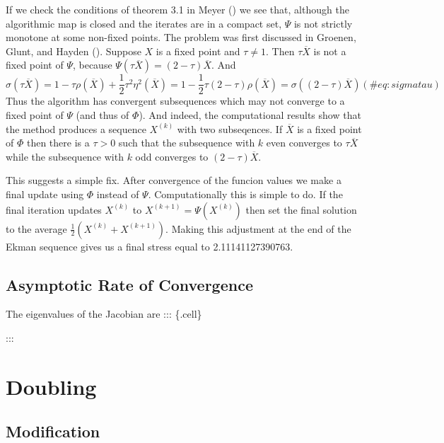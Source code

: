 \documentclass[
  12pt,
  letterpaper,
  DIV=11,
  numbers=noendperiod]{scrartcl}
\begin{document}
If we check the conditions of theorem 3.1 in Meyer
() we see that, although the algorithmic
map is closed and the iterates are in a compact set, \(\Psi\) is not
strictly monotone at some non-fixed points. The problem was first
discussed in Groenen, Glunt, and Hayden
(). Suppose \(X\) is a fixed
point and \(\tau\not= 1\). Then \(\tau\overline{X}\) is not a fixed
point of \(\Psi\), because
\(\Psi(\tau\overline{X})=(2-\tau)\overline{X}\). And \begin{equation}
\sigma(\tau\overline{X})=1-\tau\rho(\overline{X})+\frac12\tau^2\eta^2(\overline{X})=
1-\frac12\tau(2-\tau)\rho(\overline{X})=\sigma((2-\tau)\overline{X})
(\#eq:sigmatau)
\end{equation} Thus the algorithm has convergent subsequences which may
not converge to a fixed point of \(\Psi\) (and thus of \(\Phi\)). And
indeed, the computational results show that the method produces a
sequence \(X^{(k)}\) with two subseqences. If \(\overline{X}\) is a
fixed point of \(\Phi\) then there is a \(\tau>0\) such that the
subsequence with \(k\) even converges to \(\tau\overline{X}\) while the
subsequence with \(k\) odd converges to \((2-\tau)\overline{X}\).

This suggests a simple fix. After convergence of the funcion values we
make a final update using \(\Phi\) instead of \(\Psi\). Computationally
this is simple to do. If the final iteration updates \(X^{(k)}\) to
\(X^{(k+1)}=\Psi(X^{(k)})\) then set the final solution to the average
\(\frac12(X^{(k)}+X^{(k+1)})\). Making this adjustment at the end of the
Ekman sequence gives us a final stress equal to 2.11141127390763.

\subsection{Asymptotic Rate of
Convergence}\label{asymptotic-rate-of-convergence-4}

The eigenvalues of the Jacobian are ::: \{.cell\}

:::

\section{Doubling}\label{doubling}

\subsection{Modification}\label{modification-4}
\end{document}
